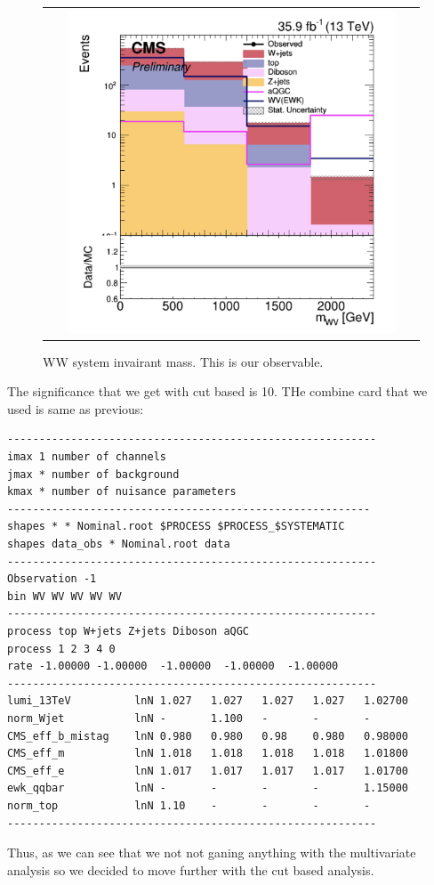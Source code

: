 \begin{figure}[htb]
  \begin{center}
    \begin{tabular}{c}
    \includegraphics[width=0.90\textwidth]{Plots/BDT_Performance/mWW_CutBased.png}    
    \end{tabular}
    \caption{WW system invairant mass. This is our observable.}
    \label{fig:cutbasedObs}
  \end{center}
\end{figure}

The significance that we get with cut based is 10. THe combine card that we used is same as previous:
\begin{verbatim}
----------------------------------------------------------
imax 1 number of channels
jmax * number of background
kmax * number of nuisance parameters
---------------------------------------------------------
shapes * * Nominal.root $PROCESS $PROCESS_$SYSTEMATIC
shapes data_obs * Nominal.root data
----------------------------------------------------------
Observation -1
bin WV WV WV WV WV
----------------------------------------------------------
process top W+jets Z+jets Diboson aQGC
process 1 2 3 4 0
rate -1.00000 -1.00000  -1.00000  -1.00000  -1.00000  
----------------------------------------------------------
lumi_13TeV			lnN	1.027	1.027	1.027	1.027	1.02700  
norm_Wjet 			lnN	-		1.100	-		-		-  
CMS_eff_b_mistag	lnN	0.980	0.980	0.98	0.980	0.98000
CMS_eff_m      		lnN	1.018	1.018	1.018	1.018	1.01800
CMS_eff_e      		lnN	1.017	1.017	1.017	1.017	1.01700
ewk_qqbar      		lnN	-		-		-		-		1.15000   
norm_top          	lnN	1.10	-		-		-		-  
----------------------------------------------------------
\end{verbatim}

Thus, as we can see that we not not ganing anything with the multivariate analysis so we decided to move further with the cut based analysis.
